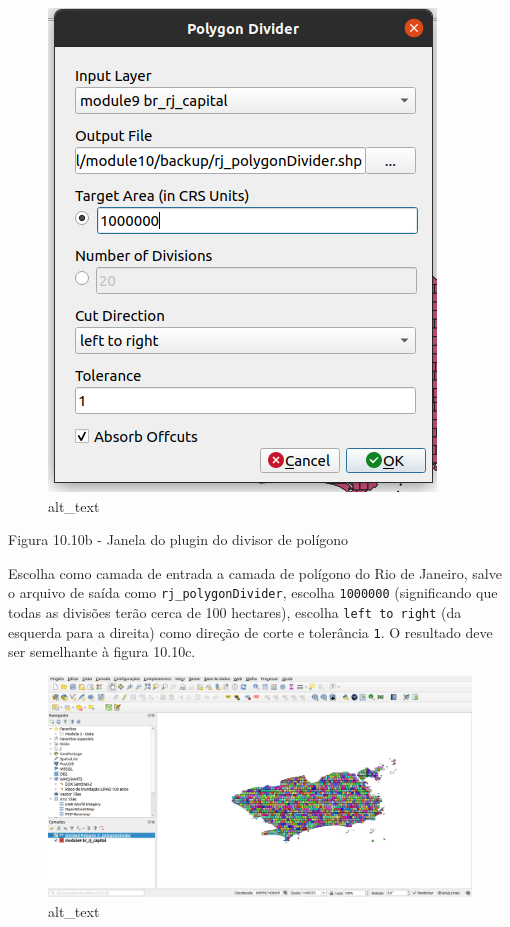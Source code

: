 \documentclass[
  portuguese,
]{krantz}
\begin{document}
\begin{figure}
\centering
\includegraphics{media/modulo10/fig1010_b.png}
\caption{alt\_text}
\end{figure}

Figura 10.10b - Janela do plugin do divisor de polígono

Escolha como camada de entrada a camada de polígono do Rio de Janeiro, salve o arquivo de saída como \texttt{rj\_polygonDivider}, escolha \texttt{1000000} (significando que todas as divisões terão cerca de 100 hectares), escolha \texttt{left\ to\ right} (da esquerda para a direita) como direção de corte e tolerância \texttt{1}. O resultado deve ser semelhante à figura 10.10c.

\begin{figure}
\centering
\includegraphics{media/modulo10/fig1010_c.png}
\caption{alt\_text}
\end{figure}
\end{document}
